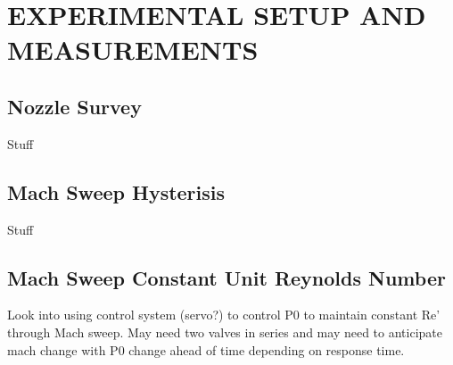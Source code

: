 %
%  
%

\chapter{EXPERIMENTAL SETUP AND MEASUREMENTS}

\section{Nozzle Survey}

Stuff

\section{Mach Sweep Hysterisis}

Stuff

\section{Mach Sweep Constant Unit Reynolds Number}

Look into using control system (servo?) to control P0 to maintain constant Re' through Mach sweep. May need two valves in series and may need to anticipate mach change with P0 change ahead of time depending on response time.
